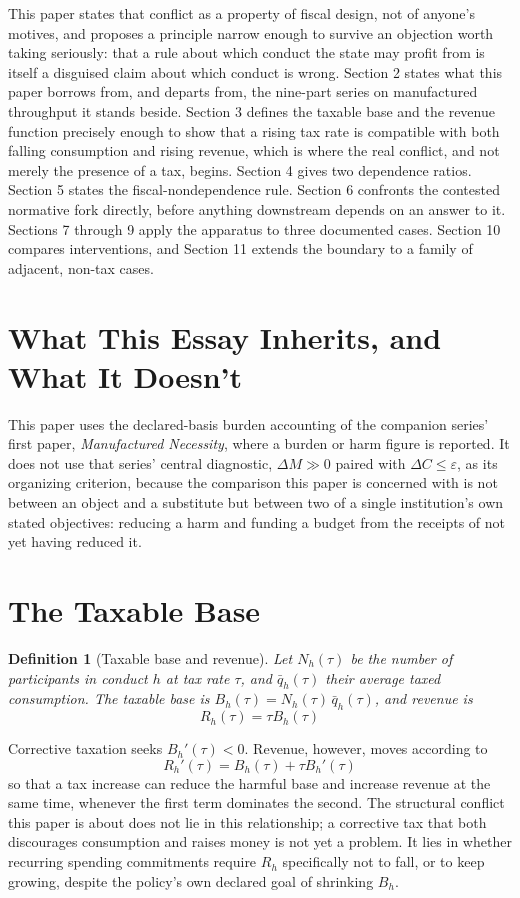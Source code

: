 \documentclass[11pt]{article}
\newtheorem{definition}{Definition}[section]
\begin{document}
This paper states that conflict as a property of fiscal design, not of anyone's motives, and proposes a principle narrow enough to survive an objection worth taking seriously: that a rule about which conduct the state may profit from is itself a disguised claim about which conduct is wrong. Section 2 states what this paper borrows from, and departs from, the nine-part series on manufactured throughput it stands beside. Section 3 defines the taxable base and the revenue function precisely enough to show that a rising tax rate is compatible with both falling consumption and rising revenue, which is where the real conflict, and not merely the presence of a tax, begins. Section 4 gives two dependence ratios. Section 5 states the fiscal-nondependence rule. Section 6 confronts the contested normative fork directly, before anything downstream depends on an answer to it. Sections 7 through 9 apply the apparatus to three documented cases. Section 10 compares interventions, and Section 11 extends the boundary to a family of adjacent, non-tax cases.

\section{What This Essay Inherits, and What It Doesn't}

This paper uses the declared-basis burden accounting of the companion series' first paper, \emph{Manufactured Necessity}, where a burden or harm figure is reported. It does not use that series' central diagnostic, $\Delta M \gg 0$ paired with $\Delta C \leq \varepsilon$, as its organizing criterion, because the comparison this paper is concerned with is not between an object and a substitute but between two of a single institution's own stated objectives: reducing a harm and funding a budget from the receipts of not yet having reduced it.

\section{The Taxable Base}

\begin{definition}[Taxable base and revenue]
Let $N_h(\tau)$ be the number of participants in conduct $h$ at tax rate $\tau$, and $\bar{q}_h(\tau)$ their average taxed consumption. The taxable base is $B_h(\tau) = N_h(\tau)\,\bar{q}_h(\tau)$, and revenue is
\[
R_h(\tau) = \tau B_h(\tau)
\]
\end{definition}

Corrective taxation seeks $B_h'(\tau) < 0$. Revenue, however, moves according to
\[
R_h'(\tau) = B_h(\tau) + \tau B_h'(\tau)
\]
so that a tax increase can reduce the harmful base and increase revenue at the same time, whenever the first term dominates the second. The structural conflict this paper is about does not lie in this relationship; a corrective tax that both discourages consumption and raises money is not yet a problem. It lies in whether recurring spending commitments require $R_h$ specifically not to fall, or to keep growing, despite the policy's own declared goal of shrinking $B_h$.
\end{document}
